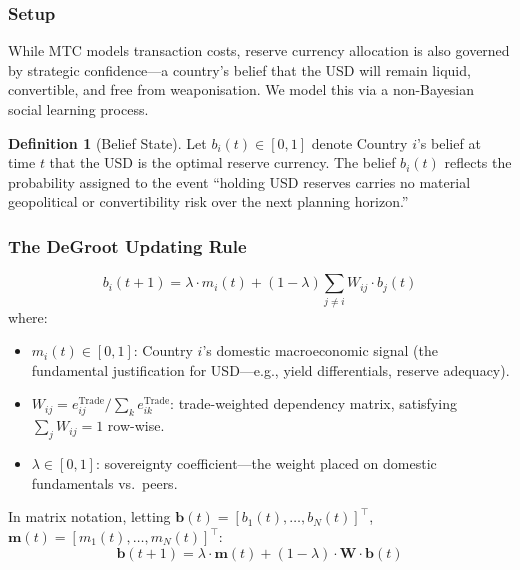 \documentclass[12pt, letterpaper]{article}
\theoremstyle{definition}
\newtheorem{definition}{Definition}
\begin{document}
\subsubsection{Setup}

While MTC models transaction costs, reserve currency allocation is also governed by strategic confidence---a country's belief that the USD will remain liquid, convertible, and free from weaponisation. We model this via a non-Bayesian social learning process.

\begin{definition}[Belief State]
Let $b_i(t) \in [0,1]$ denote Country $i$'s belief at time $t$ that the USD is the optimal reserve currency. The belief $b_i(t)$ reflects the probability assigned to the event ``holding USD reserves carries no material geopolitical or convertibility risk over the next planning horizon.''
\end{definition}

\subsubsection{The DeGroot Updating Rule}

\begin{modelbox}
\begin{equation}
b_i(t{+}1) = \lambda \cdot m_i(t) + (1-\lambda) \sum_{j \neq i} W_{ij} \cdot b_j(t)
\label{eq:degroot}
\end{equation}
where:
\begin{itemize}[nosep]
    \item $m_i(t) \in [0,1]$: Country $i$'s domestic macroeconomic signal (the fundamental justification for USD---e.g., yield differentials, reserve adequacy).
    \item $W_{ij} = e_{ij}^{\text{Trade}} / \sum_k e_{ik}^{\text{Trade}}$: trade-weighted dependency matrix, satisfying $\sum_j W_{ij} = 1$ row-wise.
    \item $\lambda \in [0,1]$: sovereignty coefficient---the weight placed on domestic fundamentals vs.\ peers.
\end{itemize}
\end{modelbox}

\noindent In matrix notation, letting $\mathbf{b}(t) = [b_1(t), \ldots, b_N(t)]^\top$, $\mathbf{m}(t) = [m_1(t), \ldots, m_N(t)]^\top$:
\begin{equation}
\mathbf{b}(t{+}1) = \lambda \cdot \mathbf{m}(t) + (1 - \lambda) \cdot \mathbf{W} \cdot \mathbf{b}(t)
\label{eq:degroot_matrix}
\end{equation}
\end{document}
